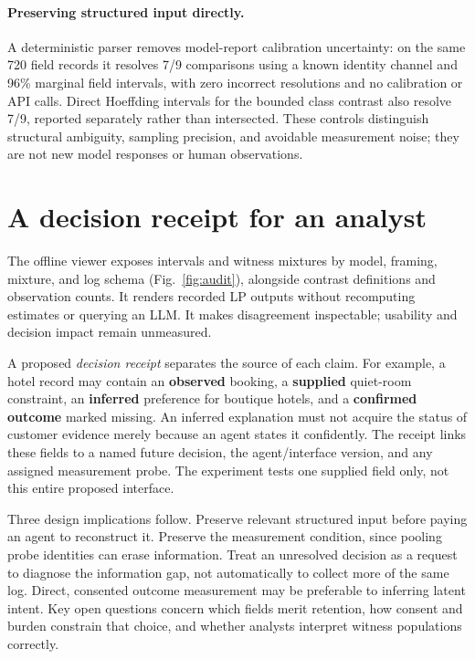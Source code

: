 \documentclass[manuscript,review,anonymous]{acmart}
\begin{document}
\paragraph{Preserving structured input directly.}
A deterministic parser removes model-report calibration uncertainty: on the same 720 field records it resolves 7/9 comparisons using a known identity channel and 96\% marginal field intervals, with zero incorrect resolutions and no calibration or API calls. Direct Hoeffding intervals for the bounded class contrast also resolve 7/9, reported separately rather than intersected. These controls distinguish structural ambiguity, sampling precision, and avoidable measurement noise; they are not new model responses or human observations. 

\section{A decision receipt for an analyst}
The offline viewer exposes intervals and witness mixtures by model, framing, mixture, and log schema (Fig.~\ref{fig:audit}), alongside contrast definitions and observation counts. It renders recorded LP outputs without recomputing estimates or querying an LLM. It makes disagreement inspectable; usability and decision impact remain unmeasured.

A proposed \emph{decision receipt} separates the source of each claim. For example, a hotel record may contain an \textbf{observed} booking, a \textbf{supplied} quiet-room constraint, an \textbf{inferred} preference for boutique hotels, and a \textbf{confirmed outcome} marked missing. An inferred explanation must not acquire the status of customer evidence merely because an agent states it confidently. The receipt links these fields to a named future decision, the agent/interface version, and any assigned measurement probe. The experiment tests one supplied field only, not this entire proposed interface.

Three design implications follow. Preserve relevant structured input before paying an agent to reconstruct it. Preserve the measurement condition, since pooling probe identities can erase information. Treat an unresolved decision as a request to diagnose the information gap, not automatically to collect more of the same log. Direct, consented outcome measurement may be preferable to inferring latent intent. Key open questions concern which fields merit retention, how consent and burden constrain that choice, and whether analysts interpret witness populations correctly.
\end{document}
